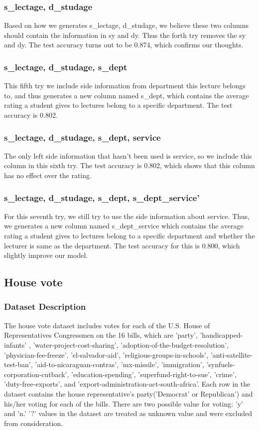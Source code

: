 \documentclass{article}
\begin{document}
\subsubsection{s\_lectage, d\_studage}
Based on how we generates s\_lectage, d\_studage, we believe these two columns should contain the information in sy and dy. Thus the forth try removes the sy and dy. The test accuracy turns out to be 0.874, which confirms our thoughts.
\subsubsection{s\_lectage, d\_studage, s\_dept}
This fifth try we include side information from department this lecture belongs to, and thus generates a new column named s\_dept, which contains the average rating a student gives to lectures belong to a specific department. The test accuracy is 0.802.
\subsubsection{s\_lectage, d\_studage, s\_dept, service}
The only left side information that hasn't been used is service, so we include this column in this sixth try. The test accuracy is 0.802, which shows that this column has no effect over the rating.
\subsubsection{s\_lectage, d\_studage, s\_dept, s\_dept\_service'}
For this seventh try, we still try to use the side information about service. Thus, we generates a new column named s\_dept\_service which contains the average rating a student gives to lectures belong to a specific department and whether the lecturer is same as the department. The test accuracy for this is 0.800, which slightly improve our model.

\subsection{House vote}
\subsubsection{Dataset Description }
The house vote dataset includes votes for each of the U.S. House of Representatives Congressmen on the 16 bills, which are 'party', 'handicapped-infants'
, 'water-project-cost-sharing', 'adoption-of-the-budget-resolution', 'physician-fee-freeze', 'el-salvador-aid', 'religious-groups-in-schools', 'anti-satellite-test-ban', 'aid-to-nicaraguan-contras', 'mx-missile', 'immigration', 'synfuels-corporation-cutback', 'education-spending', 'superfund-right-to-sue', 'crime', 'duty-free-exports', and 'export-administration-act-south-africa'. Each row in the dataset contains the house representative's party('Democrat' or Republican') and his/her voting for each of the bills. There are two possible value for voting: 'y' and 'n.' '?' values in the dataset are treated as unknown value and were excluded from consideration. 
\end{document}
